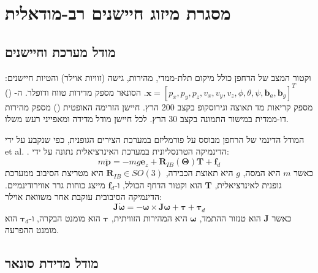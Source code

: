 

\section{מסגרת מיזוג חיישנים רב-מודאלית}
\label{sec:ch05_fusion}

\subsection{מודל מערכת וחיישנים}
\label{sec:ch05_system_model}

וקטור המצב של הרחפן כולל מיקום תלת-ממדי, מהירות, גישה (זוויות אוילר) והטיות חיישנים: $\mathbf{x} = [p_x, p_y, p_z, v_x, v_y, v_z, \phi, \theta, \psi, \mathbf{b}_a, \mathbf{b}_g]^T$. הסונאר מספק מדידות טווח ודופלר. ה- () מספק קריאות מד תאוצה וגירוסקופ בקצב 200 הרץ. חיישן הזרימה האופטית () מספק מהירות דו-ממדית במישור התמונה בקצב 30 הרץ. לכל חיישן מודל מדידה ומאפייני רעש משלו.

המודל הדינמי של הרחפן מבוסס על פורמליזם  במערכת הצירים הגופנית, כפי שנקבע על ידי  et al. \cite{Thrun2005ProbRobotics}. הדינמיקה הטרנסליונית במערכת האינרציאלית נתונה על ידי:
\begin{equation}
m \ddot{\mathbf{p}} = -m g \mathbf{e}_z + \mathbf{R}_{IB}(\boldsymbol{\Theta}) \mathbf{T} + \mathbf{f}_d
\label{eq:ch05_dynamics}
\end{equation}
כאשר $m$ היא המסה, $g$ היא תאוצת הכבידה, $\mathbf{R}_{IB} \in SO(3)$ היא מטריצת הסיבוב ממערכת גופנית לאינרציאלית, $\mathbf{T}$ הוא וקטור הדחף הכולל, ו-$\mathbf{f}_d$ מייצג כוחות גרר אווירודינמיים. הדינמיקה הסיבובית עוקבת אחר משוואת אוילר:
\begin{equation}
\mathbf{J} \dot{\boldsymbol{\omega}} = -\boldsymbol{\omega} \times \mathbf{J} \boldsymbol{\omega} + \boldsymbol{\tau} + \boldsymbol{\tau}_d
\label{eq:ch05_rotational}
\end{equation}
כאשר $\mathbf{J}$ הוא טנזור ההתמד, $\boldsymbol{\omega}$ היא המהירות הזוויתית, $\boldsymbol{\tau}$ הוא מומנט הבקרה, ו-$\boldsymbol{\tau}_d$ הוא מומנט ההפרעה.

\subsection{מודל מדידת סונאר}
\label{sec:ch05_sonar_model}

